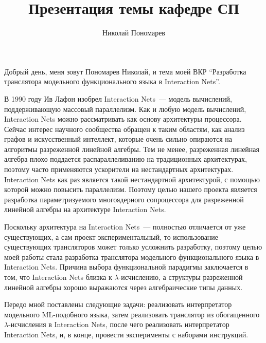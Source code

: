 \documentclass[12pt]{scrartcl}
\title{Презентация темы кафедре СП}
\author{Николай Пономарев}
\begin{document}
\maketitle


Добрый день, меня зовут Пономарев Николай, и тема моей ВКР \enquote{Разработка транслятора модельного функционального языка в Interaction Nets}.


В 1990 году Ив Лафон изобрел Interaction Nets~--- модель вычислений, поддерживающую массовый параллелизм.
Как и любую модель вычислений, Interaction Nets можно рассматривать как основу архитектуры процессора.
Сейчас интерес научного сообщества обращен к таким областям, как анализ графов и искусственный интеллект, которые очень сильно опираются на алгоритмы разреженной линейной алгебры.
Тем не менее, разреженная линейная алгебра плохо поддается распараллеливанию на традиционных архитектурах, поэтому часто применяются ускорители на нестандартных архитектурах.
Interaction Nets как раз является такой нестандартной архитектурой, с помощью которой можно повысить параллелизм.
Поэтому целью нашего проекта является разработка параметризуемого многоядерного сопроцессора для разреженной линейной алгебры на архитектуре Interaction Nets.


Поскольку архитектура на Interaction Nets~--- полностью отличается от уже существующих, а сам проект экспериментальный, то использование существующих трансляторов может только усложнить разработку, поэтому целью моей работы стала разработка транслятора модельного функционального языка в Interaction Nets.
Причина выбора функциональной парадигмы заключается в том, что Interaction Nets близка к $\lambda$-исчислению, а структуры разреженной линейной алгебры хорошо выражаются через алгебраические типы данных.

Передо мной поставлены следующие задачи: реализовать интерпретатор модельного ML-подобного языка, затем реализовать транслятор из обогащенного $\lambda$-исчисления в Interaction Nets, после чего реализовать интерпретатор Interaction Nets, и, в конце, провести эксперименты с наборами инструкций.
\end{document}
